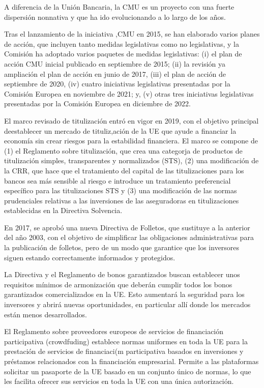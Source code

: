 \documentclass[10pt,a4paper]{article}
\begin{document}
{{    A diferencia de la Unión Bancaria, la CMU es un proyecto con una fuerte dispersión nonnativa y que ha ido evolucionando a lo largo de los años. 
    
    Tras el lanzamiento de la iniciativa ,CMU en 2015, se han elaborado varios planes de acción, que incluyen tanto medidas legislativas como no legislativas, y la Comisión ha adoptado varios paquetes de medidas legislativas: (i) el plan de acción CMU inicial publicado en septiembre de 2015; (ii) la revisión ya ampliación el plan de acción en junio de 2017, (iii) el plan de acción de septiembre de 2020, (iv) cuatro iniciativas legislativas presentadas por la Comisión Europea en noviembre de 2021; y, (v) otras tres iniciativas legislativas presentadas por la Comisión Europea en diciembre de 2022. 
    
    El marco revisado de titulización entró en vigor en 2019, con el objetivo principal deestablecer un mercado de tituliz,ación de la UE que ayude a financiar la economía sin crear riesgos para la estabilidad financiera. El marco se compone de (1) el Reglamento sobre titulización, que crea una categorja de productos de titulización simples, transparentes y normalizados (STS), (2) una modificación de la CRR, que hace que el tratamiento del capital de las titulizaciones para los bancos sea más sensible al riesgo e introduce un tratamiento preferencial específico para las titulizaciones STS y (3) una modificación de las normas prudenciales relativas a las inversiones de las aseguradoras en titulizaciones establecidas en la Directiva Solvencia. 
    
    En 2017, se aprobó una nueva Directiva de Folletos, que sustituye a la anterior del año 2003, con el objetivo de simplificar las obligaciones administrativas para la publicación de folletos, pero de un modo que garantice que los inversores siguen estando correctamente informados y protegidos. 
    
    La Directiva y el Reglamento de bonos garantizados buscan establecer unos requisitos mínimos de armonización que deberán cumplir todos los bonos garantizados comercializados en la UE. Esto aumentará la seguridad para los inversores y abrirá nuevas oportunidades, en particular allí donde los mercados están menos desarrollados. 
    
    El Reglamento sobre proveedores europeos de servicios de financiación participativa (crowdfuding) establece normas uniformes en toda la UE para la prestación de servicios de financiaci(m participativa basados en inversiones y préstamos relacionados con la financiación empresarial. Permite a las plataformas solicitar un pasaporte de la UE basado en un conjunto único de normas, lo que les facilita ofrecer sus servicios en toda la UE con una única autorización. 
    
}}
\end{document}
